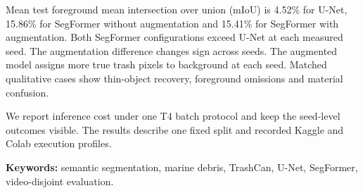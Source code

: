 \documentclass[oneside,final,a4 paper]{hcmut-report}
\begin{document}
Mean test foreground mean intersection over union (mIoU) is 4.52\% for U-Net, 15.86\% for SegFormer without augmentation and 15.41\% for SegFormer with augmentation. Both SegFormer configurations exceed U-Net at each measured seed. The augmentation difference changes sign across seeds. The augmented model assigns more true trash pixels to background at each seed. Matched qualitative cases show thin-object recovery, foreground omissions and material confusion.

We report inference cost under one T4 batch protocol and keep the seed-level outcomes visible. The results describe one fixed split and recorded Kaggle and Colab execution profiles.

\vspace{0.4 cm}
\textbf{Keywords:} semantic segmentation, marine debris, TrashCan, U-Net, SegFormer, video-disjoint evaluation.
\clearpage
\begingroup
{}
\tableofcontents
\endgroup
\clearpage
{}

\clearpage

\clearpage

\clearpage

\clearpage
\appendix

\end{document}
